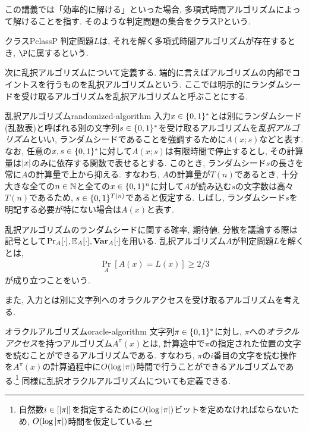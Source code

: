 この講義では「効率的に解ける」といった場合, 多項式時間アルゴリズムによって解けることを指す. そのような判定問題の集合をクラスPという.
\begin{definition}{クラスP}{classP}
  判定問題$L$は, それを解く多項式時間アルゴリズムが存在するとき, $\P$に属するという.
\end{definition}

次に乱択アルゴリズムについて定義する. 端的に言えばアルゴリズムの内部でコイントスを行うものを乱択アルゴリズムという.
ここでは明示的にランダムシードを受け取るアルゴリズムを乱択アルゴリズムと呼ぶことにする.

\begin{definition}{乱択アルゴリズム}{randomized-algorithm}
  入力$x\in\{0,1\}^*$とは別にランダムシード(乱数表)と呼ばれる別の文字列$s\in\{0,1\}^*$を受け取るアルゴリズムを\emph{乱択アルゴリズム}といい, ランダムシードであることを強調するために$A(x;s)$などと表す.
  なお, 任意の$x,s\in\{0,1\}^*$に対して$A(x;s)$は有限時間で停止するとし, その計算量は$\abs{x}$のみに依存する関数で表せるとする.
  このとき, ランダムシード$s$の長さを常に$A$の計算量で上から抑える.
  すなわち, $A$の計算量が$T(n)$であるとき, 十分大きな全ての$n\in\mathbb{N}$と全ての$x\in\{0,1\}^n$に対して$A$が読み込む$s$の文字数は高々$T(n)$であるため, $s\in \{0,1\}^{T(n)}$であると仮定する.
  しばし, ランダムシード$s$を明記する必要が特にない場合は$A(x)$と表す.

  乱択アルゴリズムのランダムシードに関する確率, 期待値, 分散を議論する際は記号として$\Pr_{A}[\cdot],\operatorname*{\mathbb{E}}_A[\cdot],\operatorname*{\mathbf{Var}}_A[\cdot]$を用いる.
  乱択アルゴリズム$A$が判定問題$L$を解くとは,
  \begin{align*}
    \Pr_A[A(x)=L(x)]\geq 2/3
  \end{align*}
  が成り立つことをいう.
\end{definition}

また, 入力とは別に文字列へのオラクルアクセスを受け取るアルゴリズムを考える.
\begin{definition}{オラクルアルゴリズム}{oracle-algorithm}
  文字列$\pi\in\{0,1\}^*$に対し, $\pi$への\emph{オラクルアクセス}を持つアルゴリズム$A^\pi(x)$とは, 計算途中で$\pi$の指定された位置の文字を読むことができるアルゴリズムである.
  すなわち, $\pi$の$i$番目の文字を読む操作を$A^\pi(x)$の計算過程中に$O(\log \abs{\pi})$時間で行うことができるアルゴリズムである.\footnote{自然数$i\in[\abs{\pi}]$を指定するために$O(\log \abs{\pi})$ビットを定めなければならないため, $O(\log \abs{\pi})$時間を仮定している.}
  同様に乱択オラクルアルゴリズムについても定義できる.
\end{definition}


